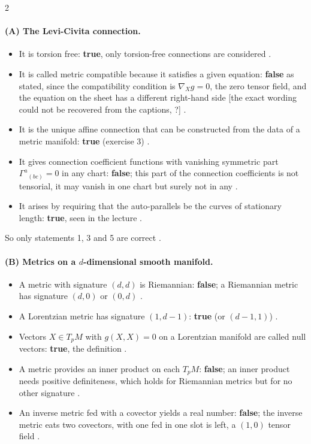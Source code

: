 \begin{paracol}{2}
\paragraph{(A) The Levi-Civita connection.}
\begin{itemize}
  \item It is torsion free: \textbf{true}, only torsion-free connections are considered .
  \item It is called metric compatible because it satisfies a given equation: \textbf{false} as stated, since the compatibility condition is $\nabla_Xg=0$, the zero tensor field, and the equation on the sheet has a different right-hand side [the exact wording could not be recovered from the captions, ?] .
  \item It is the unique affine connection that can be constructed from the data of a metric manifold: \textbf{true} (exercise 3) .
  \item It gives connection coefficient functions with vanishing symmetric part $\Gamma^a{}_{(bc)}=0$ in any chart: \textbf{false}; this part of the connection coefficients is not tensorial, it may vanish in one chart but surely not in any .
  \item It arises by requiring that the auto-parallels be the curves of stationary length: \textbf{true}, seen in the lecture .
\end{itemize}
So only statements 1, 3 and 5 are correct .

\paragraph{(B) Metrics on a $d$-dimensional smooth manifold.}
\begin{itemize}
  \item A metric with signature $(d,d)$ is Riemannian: \textbf{false}; a Riemannian metric has signature $(d,0)$ or $(0,d)$ .
  \item A Lorentzian metric has signature $(1,d-1)$: \textbf{true} (or $(d-1,1)$) .
  \item Vectors $X\in T_pM$ with $g(X,X)=0$ on a Lorentzian manifold are called null vectors: \textbf{true}, the definition .
  \item A metric provides an inner product on each $T_pM$: \textbf{false}; an inner product needs positive definiteness, which holds for Riemannian metrics but for no other signature .
  \item An inverse metric fed with a covector yields a real number: \textbf{false}; the inverse metric eats two covectors, with one fed in one slot is left, a $(1,0)$ tensor field .
\end{itemize}


\end{paracol}
